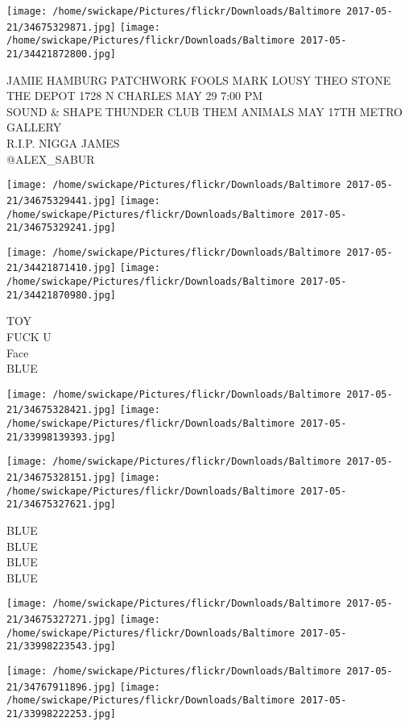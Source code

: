 \documentclass[10pt,letterpaper]{article}
\begin{document}
\texttt{[image: /home/swickape/Pictures/flickr/Downloads/Baltimore 2017-05-21/34675329871.jpg]}
\texttt{[image: /home/swickape/Pictures/flickr/Downloads/Baltimore 2017-05-21/34421872800.jpg]}

JAMIE HAMBURG PATCHWORK FOOLS MARK LOUSY THEO STONE THE DEPOT 1728 N CHARLES MAY 29 7:00 PM\\
SOUND \& SHAPE THUNDER CLUB THEM ANIMALS MAY 17TH METRO GALLERY\\
R.I.P. NIGGA JAMES\\
@ALEX\_SABUR
\pagebreak

\texttt{[image: /home/swickape/Pictures/flickr/Downloads/Baltimore 2017-05-21/34675329441.jpg]}
\texttt{[image: /home/swickape/Pictures/flickr/Downloads/Baltimore 2017-05-21/34675329241.jpg]}

\texttt{[image: /home/swickape/Pictures/flickr/Downloads/Baltimore 2017-05-21/34421871410.jpg]}
\texttt{[image: /home/swickape/Pictures/flickr/Downloads/Baltimore 2017-05-21/34421870980.jpg]}

TOY\\
FUCK U\\
Face\\
BLUE
\pagebreak

\texttt{[image: /home/swickape/Pictures/flickr/Downloads/Baltimore 2017-05-21/34675328421.jpg]}
\texttt{[image: /home/swickape/Pictures/flickr/Downloads/Baltimore 2017-05-21/33998139393.jpg]}

\texttt{[image: /home/swickape/Pictures/flickr/Downloads/Baltimore 2017-05-21/34675328151.jpg]}
\texttt{[image: /home/swickape/Pictures/flickr/Downloads/Baltimore 2017-05-21/34675327621.jpg]}

BLUE\\
BLUE\\
BLUE\\
BLUE
\pagebreak

\texttt{[image: /home/swickape/Pictures/flickr/Downloads/Baltimore 2017-05-21/34675327271.jpg]}
\texttt{[image: /home/swickape/Pictures/flickr/Downloads/Baltimore 2017-05-21/33998223543.jpg]}

\texttt{[image: /home/swickape/Pictures/flickr/Downloads/Baltimore 2017-05-21/34767911896.jpg]}
\texttt{[image: /home/swickape/Pictures/flickr/Downloads/Baltimore 2017-05-21/33998222253.jpg]}
\end{document}
